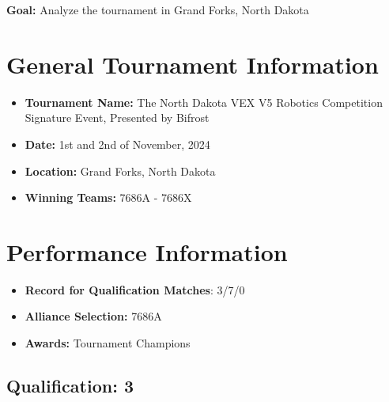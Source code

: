 \textbf{Goal:} Analyze the tournament in Grand Forks, North Dakota
\section*{General Tournament Information}
\begin{itemize}
    \item \textbf{Tournament Name:} The North Dakota VEX V5 Robotics Competition Signature Event, Presented by Bifrost
    \item \textbf{Date:} 1st and 2nd of November, 2024
    \item \textbf{Location:} Grand Forks, North Dakota 
    \item \textbf{Winning Teams:} 7686A - 7686X
\end{itemize}

\section*{Performance Information}
\begin{itemize}
    \item \textbf{Record for Qualification Matches}: 3/7/0
    \item \textbf{Alliance Selection:} 7686A
    \item \textbf{Awards:} Tournament Champions 
\end{itemize}

\subsection*{Qualification: 3}
